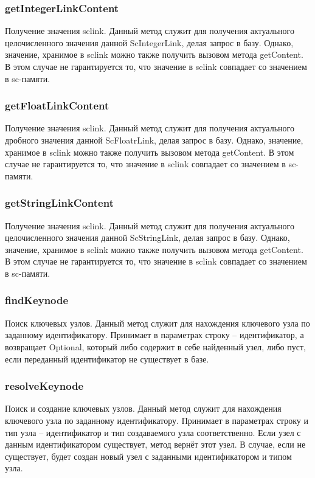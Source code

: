 \subsubsection {getIntegerLinkContent} Получение значения sclink. Данный метод служит для получения актуального целочисленного значения данной ScIntegerLink, делая запрос в базу. Однако, значение, хранимое в sclink можно также получить вызовом метода getContent. В этом случае не гарантируется то, что значение в sclink совпадает со значением в sc-памяти.
\subsubsection {getFloatLinkContent} Получение значения sclink. Данный метод служит для получения актуального дробного значения данной ScFloatrLink, делая запрос в базу. Однако, значение, хранимое в sclink можно также получить вызовом метода getContent. В этом случае не гарантируется то, что значение в sclink совпадает со значением в sc-памяти.
\subsubsection {getStringLinkContent} Получение значения sclink. Данный метод служит для получения актуального целочисленного значения данной ScStringLink, делая запрос в базу. Однако, значение, хранимое в sclink можно также получить вызовом метода getContent. В этом случае не гарантируется то, что значение в sclink совпадает со значением в sc-памяти.

\subsubsection{findKeynode}

Поиск ключевых узлов. Данный метод служит для нахождения ключевого узла по заданному идентификатору. Принимает в параметрах строку -- идентификатор, а возвращает Optional, который либо содержит в себе найденный узел, либо пуст, если переданный идентификатор не существует в базе. 

\subsubsection{resolveKeynode}

Поиск и создание ключевых узлов. Данный метод служит для нахождения ключевого узла по заданному идентификатору. Принимает в параметрах строку и тип узла -- идентификатор и тип создаваемого узла соответственно. Если узел с данным идентификатором существует, метод вернёт этот узел. В случае, если не существует, будет создан новый узел с заданными идентификатором и типом узла. 


